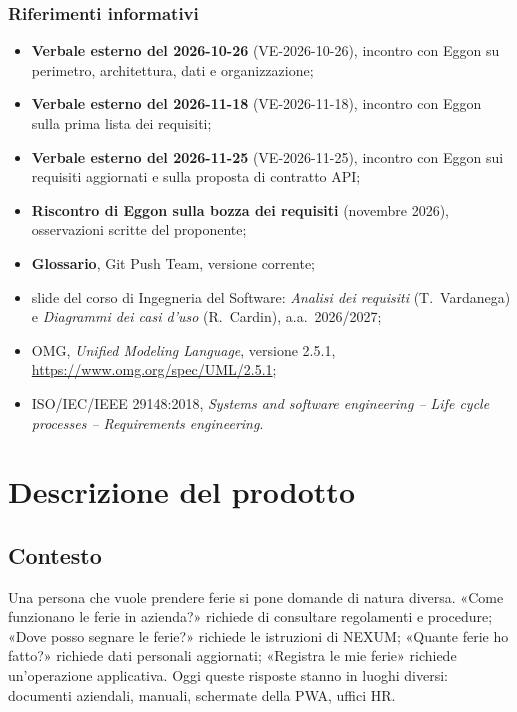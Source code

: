 \documentclass[documento]{gpt}
\begin{document}
\subsubsection{Riferimenti informativi}
\begin{itemize}
  \item \textbf{Verbale esterno del 2026-10-26} (VE-2026-10-26), incontro con
        Eggon su perimetro, architettura, dati e organizzazione;
  \item \textbf{Verbale esterno del 2026-11-18} (VE-2026-11-18), incontro con
        Eggon sulla prima lista dei requisiti;
  \item \textbf{Verbale esterno del 2026-11-25} (VE-2026-11-25), incontro con
        Eggon sui requisiti aggiornati e sulla proposta di contratto API;
  \item \textbf{Riscontro di Eggon sulla bozza dei requisiti} (novembre 2026),
        osservazioni scritte del proponente;
  \item \textbf{Glossario}, Git Push Team, versione corrente;
  \item slide del corso di Ingegneria del Software: \textit{Analisi dei
        requisiti} (T.~Vardanega) e \textit{Diagrammi dei casi d'uso}
        (R.~Cardin), a.a.~2026/2027;
  \item OMG, \textit{Unified Modeling Language}, versione 2.5.1,
        \url{https://www.omg.org/spec/UML/2.5.1};
  \item ISO/IEC/IEEE 29148:2018, \textit{Systems and software engineering --
        Life cycle processes -- Requirements engineering}.
\end{itemize}


\section{Descrizione del prodotto}\label{sec:prodotto}

\subsection{Contesto}
Una persona che vuole prendere ferie si pone domande di natura diversa.
«Come funzionano le ferie in azienda?» richiede di consultare regolamenti e
procedure; «Dove posso segnare le ferie?» richiede le istruzioni di NEXUM;
«Quante ferie ho fatto?» richiede dati personali aggiornati; «Registra le mie
ferie» richiede un'operazione applicativa. Oggi queste risposte stanno in
luoghi diversi: documenti aziendali, manuali, schermate della PWA, uffici HR.
\end{document}
